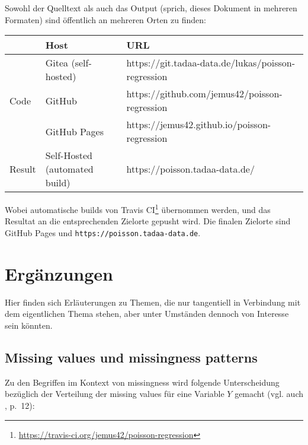 \documentclass[ngerman,a4paper,]{scrartcl}
\DeclareRobustCommand{\href}[2]{#2\footnote{\url{#1}}}
\theoremstyle{definition}
\theoremstyle{definition}
\theoremstyle{definition}
\theoremstyle{remark}
\begin{document}
Sowohl der Quelltext als auch das Output (sprich, dieses Dokument in mehreren Formaten) sind öffentlich an mehreren Orten zu finden:

\begin{table}[H]
\centering
\begin{tabular}{lll}
\toprule
  & Host & URL\\
\midrule
 & Gitea (self-hosted) & https://git.tadaa-data.de/lukas/poisson-regression\\
\cmidrule{2-3}
\multirow{-2}{*}{\raggedright\arraybackslash Code} & GitHub & https://github.com/jemus42/poisson-regression\\
\cmidrule{1-3}
 & GitHub Pages & https://jemus42.github.io/poisson-regression\\
\cmidrule{2-3}
\multirow{-2}{*}{\raggedright\arraybackslash Result} & Self-Hosted (automated build) & https://poisson.tadaa-data.de/\\
\bottomrule
\end{tabular}
\end{table}

Wobei automatische builds von \href{https://travis-ci.org/jemus42/poisson-regression}{Travis CI} übernommen werden, und das Resultat an die entsprechenden Zielorte gepusht wird. Die finalen Zielorte sind GitHub Pages und \texttt{https://poisson.tadaa-data.de}.

\hypertarget{erguxe4nzungen}{%
\section{Ergänzungen}\label{erguxe4nzungen}}

Hier finden sich Erläuterungen zu Themen, die nur tangentiell in Verbindung mit dem eigentlichen Thema stehen, aber unter Umständen dennoch von Interesse sein könnten.

\hypertarget{appendix-missingness}{%
\subsection{Missing values und missingness patterns}\label{appendix-missingness}}

Zu den Begriffen im Kontext von missingness wird folgende Unterscheidung bezüglich der Verteilung der missing values für eine Variable \(Y\) gemacht (vgl. auch \citet{littleStatisticalAnalysisMissing2002}, p.~12):
\end{document}
